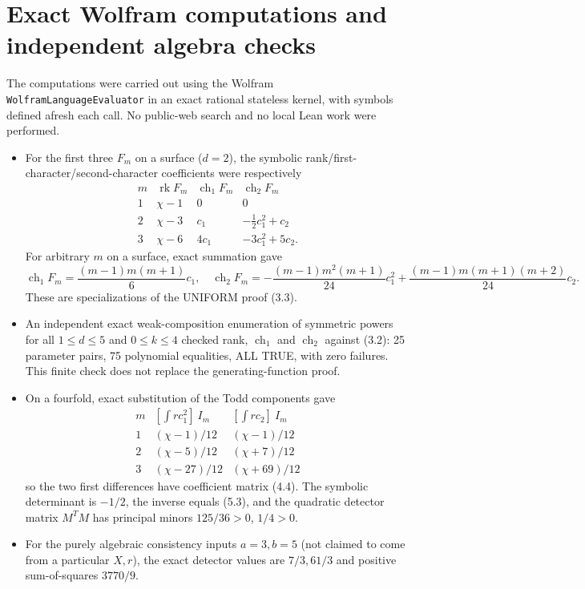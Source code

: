 \documentclass[11pt]{article}
\newcommand{\ch}{\operatorname{ch}}
\newcommand{\rk}{\operatorname{rk}}
\begin{document}
\section{Exact Wolfram computations and independent algebra checks}
The computations were carried out using the Wolfram
\texttt{WolframLanguageEvaluator} in an exact rational
stateless kernel, with symbols defined afresh each call.
No public-web search and no local Lean work were performed.

\begin{itemize}
\item For the first three \(F_m\) on a surface (\(d=2\)), the
symbolic rank/first-character/second-character coefficients
were respectively
\[
\begin{array}{c|ccc}
m&\rk F_m&\ch_1F_m&\ch_2F_m\\\hline
1&\chi-1&0&0\\
2&\chi-3&c_1&-\tfrac12c_1^2+c_2\\
3&\chi-6&4c_1&-3c_1^2+5c_2.
\end{array}
\]
For arbitrary \(m\) on a surface, exact summation gave
\[
 \ch_1F_m=\frac{(m-1)m(m+1)}6c_1,\quad
 \ch_2F_m=-\frac{(m-1)m^2(m+1)}{24}c_1^2
          +\frac{(m-1)m(m+1)(m+2)}{24}c_2.
\]
These are specializations of the UNIFORM proof (3.3).
\item An independent exact weak-composition enumeration of
symmetric powers for all \(1\le d\le5\) and \(0\le k\le4\)
checked rank, \(\ch_1\) and \(\ch_2\) against (3.2):
25 parameter pairs, 75 polynomial equalities, ALL TRUE,
with zero failures. This finite check does not replace
the generating-function proof.
\item On a fourfold, exact substitution of the Todd components
gave
\[
\begin{array}{c|cc}
m&[\int r c_1^2]\ I_m&[\int r c_2]\ I_m\\\hline
1&(\chi-1)/12&(\chi-1)/12\\
2&(\chi-5)/12&(\chi+7)/12\\
3&(\chi-27)/12&(\chi+69)/12
\end{array}
\]
so the two first differences have coefficient matrix (4.4).
The symbolic determinant is \(-1/2\), the inverse equals
(5.3), and the quadratic detector matrix \(M^TM\)
has principal minors \(125/36>0\), \(1/4>0\).
\item For the purely algebraic consistency inputs \(a=3,b=5\)
(not claimed to come from a particular \(X,r\)),
the exact detector values are \(7/3,61/3\) and positive
sum-of-squares \(3770/9\).
\end{itemize}
\end{document}

